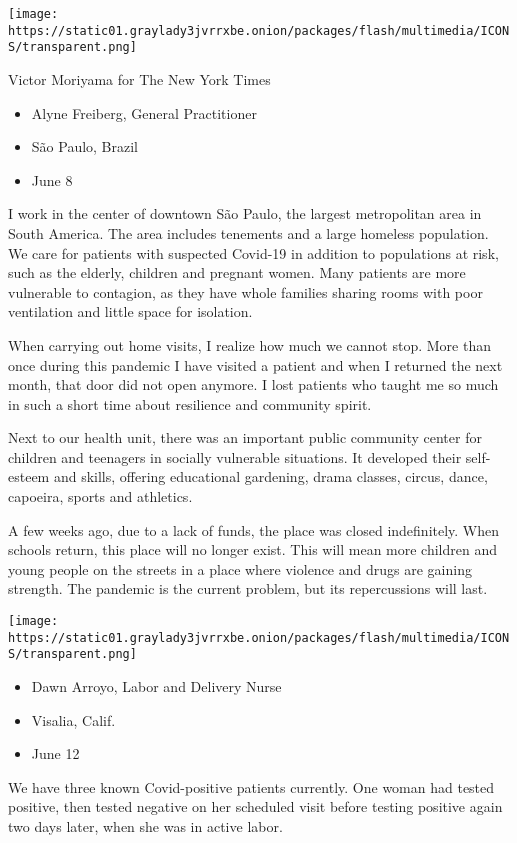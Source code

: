 \texttt{[image: https://static01.graylady3jvrrxbe.onion/packages/flash/multimedia/ICONS/transparent.png]}

Victor Moriyama for The New York Times

\begin{itemize}
\tightlist
\item
  Alyne Freiberg, General Practitioner
\item
  São Paulo, Brazil
\item
  June 8
\end{itemize}

I work in the center of downtown São Paulo, the largest metropolitan
area in South America. The area includes tenements and a large homeless
population. We care for patients with suspected Covid-19 in addition to
populations at risk, such as the elderly, children and pregnant women.
Many patients are more vulnerable to contagion, as they have whole
families sharing rooms with poor ventilation and little space for
isolation.

When carrying out home visits, I realize how much we cannot stop. More
than once during this pandemic I have visited a patient and when I
returned the next month, that door did not open anymore. I lost patients
who taught me so much in such a short time about resilience and
community spirit.

Next to our health unit, there was an important public community center
for children and teenagers in socially vulnerable situations. It
developed their self-esteem and skills, offering educational gardening,
drama classes, circus, dance, capoeira, sports and athletics.

A few weeks ago, due to a lack of funds, the place was closed
indefinitely. When schools return, this place will no longer exist. This
will mean more children and young people on the streets in a place where
violence and drugs are gaining strength. The pandemic is the current
problem, but its repercussions will last.

\texttt{[image: https://static01.graylady3jvrrxbe.onion/packages/flash/multimedia/ICONS/transparent.png]}

\begin{itemize}
\tightlist
\item
  Dawn Arroyo, Labor and Delivery Nurse
\item
  Visalia, Calif.
\item
  June 12
\end{itemize}

We have three known Covid-positive patients currently. One woman had
tested positive, then tested negative on her scheduled visit before
testing positive again two days later, when she was in active labor.

